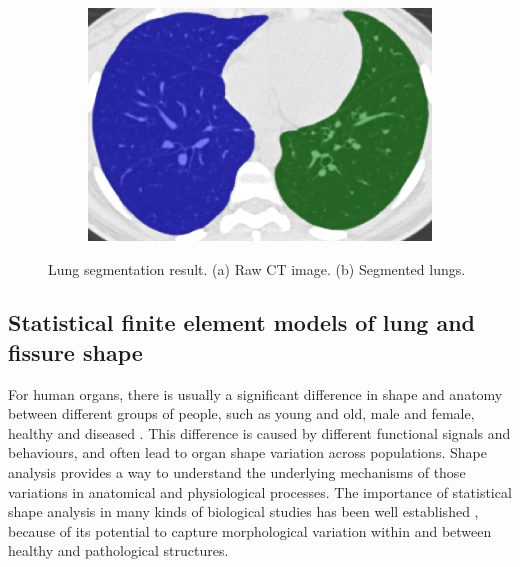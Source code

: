 \begin{figure}[htbp]
\begin{subfigure}{.4\linewidth}
  \includegraphics[width=\linewidth,trim={{.0\wd0} {.0\wd0} {.0\wd0} {.0\wd0}},clip]{Segmentation/Image/LungSegmentationAfter.png}
  \caption{}
  \label{fig:LungSegmentation-b} 
\end{subfigure}
\caption{Lung segmentation result. (a) Raw CT image. (b) Segmented lungs.}
\label{fig:LungSegmentation}
\end{figure}

\subsection{Statistical finite element models of lung and fissure shape} \label{ShapeModelGeneration}
For human organs, there is usually a significant difference in shape and anatomy between different groups of people, such as young and old, male and female, healthy and diseased \citep{krumpe1985aging, crapo1993aging}. This difference is caused by different functional signals and behaviours, and often lead to organ shape variation across populations. Shape analysis provides a way to understand the underlying mechanisms of those variations in anatomical and physiological processes. The importance of statistical shape analysis in many kinds of biological studies has been well established \citep{dryden1998statistical,stegmann2002brief,styner2003statistical,heimann2009statistical}, because of its potential to capture morphological variation within and between healthy and pathological structures.

